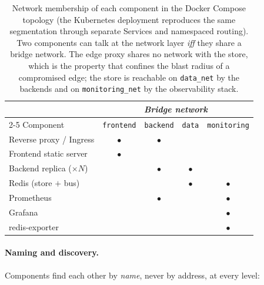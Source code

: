 \documentclass{scrartcl}
\begin{document}
\begin{table}[H]
  \centering
  \caption{Network membership of each component in the Docker Compose
    topology (the Kubernetes deployment reproduces the same segmentation
    through separate Services and namespaced routing). Two components can
    talk at the network layer \emph{iff} they share a bridge network. The
    edge proxy shares no network with the store, which is the property that
    confines the blast radius of a compromised edge; the store is reachable
    on \texttt{data\_net} by the backends and on \texttt{monitoring\_net} by
    the observability stack.}
  \label{tab:networks}
  \begin{tabular}{lcccc}
    \toprule
    & \multicolumn{4}{c}{\emph{Bridge network}} \\
    \cmidrule(l){2-5}
    Component
      & \texttt{frontend} & \texttt{backend} & \texttt{data}
      & \texttt{monitoring} \\
    \midrule
    Reverse proxy / Ingress      & $\bullet$ & $\bullet$ &           &           \\
    Frontend static server       & $\bullet$ &           &           &           \\
    Backend replica ($\times N$) &           & $\bullet$ & $\bullet$ &           \\
    Redis (store $+$ bus)        &           &           & $\bullet$ & $\bullet$ \\
    Prometheus                   &           & $\bullet$ &           & $\bullet$ \\
    Grafana                      &           &           &           & $\bullet$ \\
    redis-exporter               &           &           &           & $\bullet$ \\
    \bottomrule
  \end{tabular}
\end{table}

\paragraph{Naming and discovery.}
Components find each other by \emph{name}, never by address, at every level:
\end{document}
